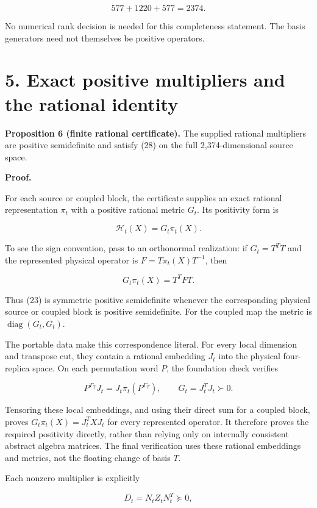 \documentclass[
  11pt,
]{article}
\begin{document}
\[
577+1220+577=2374.
\tag{22}
\]

No numerical rank decision is needed for this completeness statement.
The basis generators need not themselves be positive operators.

\section{5. Exact positive multipliers and the rational
identity}\label{exact-positive-multipliers-and-the-rational-identity}

\textbf{Proposition 6 (finite rational certificate).} The supplied
rational multipliers are positive semidefinite and satisfy (28) on the
full 2,374-dimensional source space.

\textbf{Proof.}

For each source or coupled block, the certificate supplies an exact
rational representation \(\pi_t\) with a positive rational metric
\(G_t\). Its positivity form is

\[
\mathcal H_t(X)=G_t\pi_t(X).
\tag{23}
\]

To see the sign convention, pass to an orthonormal realization: if
\(G_t=T^TT\) and the represented physical operator is
\(F=T\pi_t(X)T^{-1}\), then

\[
G_t\pi_t(X)=T^TFT.
\tag{24}
\]

Thus (23) is symmetric positive semidefinite whenever the corresponding
physical source or coupled block is positive semidefinite. For the
coupled map the metric is \(\operatorname{diag}(G_t,G_t)\).

The portable data make this correspondence literal. For every local
dimension and transpose cut, they contain a rational embedding \(J_t\)
into the physical four-replica space. On each permutation word \(P\),
the foundation check verifies

\[
P^{\Gamma_T}J_t=J_t\pi_t(P^{\Gamma_T}),
\qquad G_t=J_t^TJ_t\succ0.
\tag{24a}
\]

Tensoring these local embeddings, and using their direct sum for a
coupled block, proves \(G_t\pi_t(X)=J_t^TXJ_t\) for every represented
operator. It therefore proves the required positivity directly, rather
than relying only on internally consistent abstract algebra matrices.
The final verification uses these rational embeddings and metrics, not
the floating change of basis \(T\).

Each nonzero multiplier is explicitly

\[
D_t=N_tZ_tN_t^T\succeq0,
\tag{25}
\]
\end{document}

